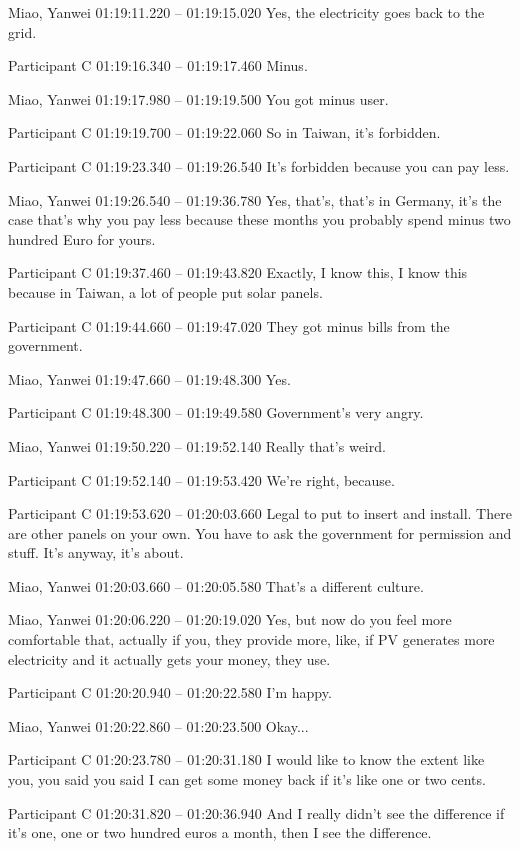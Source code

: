 {Miao, Yanwei 01:19:11.220 -- 01:19:15.020
Yes, the electricity goes back to the grid.

Participant C 01:19:16.340 -- 01:19:17.460
Minus.

Miao, Yanwei 01:19:17.980 -- 01:19:19.500
You got minus user.

Participant C 01:19:19.700 -- 01:19:22.060
So in Taiwan, it's forbidden.

Participant C 01:19:23.340 -- 01:19:26.540
It's forbidden because you can pay less.

Miao, Yanwei 01:19:26.540 -- 01:19:36.780
Yes, that's, that's in Germany, it's the case that's why you pay less because these months you probably spend minus two hundred Euro for yours.

Participant C 01:19:37.460 -- 01:19:43.820
Exactly, I know this, I know this because in Taiwan, a lot of people put solar panels.

Participant C 01:19:44.660 -- 01:19:47.020
They got minus bills from the government.

Miao, Yanwei 01:19:47.660 -- 01:19:48.300
Yes.

Participant C 01:19:48.300 -- 01:19:49.580
Government's very angry.

Miao, Yanwei 01:19:50.220 -- 01:19:52.140
Really that's weird.

Participant C 01:19:52.140 -- 01:19:53.420
We're right, because.

Participant C 01:19:53.620 -- 01:20:03.660
Legal to put to insert and install. There are other panels on your own. You have to ask the government for permission and stuff. It's anyway, it's about.

Miao, Yanwei 01:20:03.660 -- 01:20:05.580
That's a different culture.

Miao, Yanwei 01:20:06.220 -- 01:20:19.020
Yes, but now do you feel more comfortable that, actually if you, they provide more, like, if PV generates more electricity and it actually gets your money, they use.

Participant C 01:20:20.940 -- 01:20:22.580
I'm happy.

Miao, Yanwei 01:20:22.860 -- 01:20:23.500
Okay...

Participant C 01:20:23.780 -- 01:20:31.180
I would like to know the extent like you, you said you said I can get some money back if it's like one or two cents.

Participant C 01:20:31.820 -- 01:20:36.940
And I really didn't see the difference if it's one, one or two hundred euros a month, then I see the difference.

}
